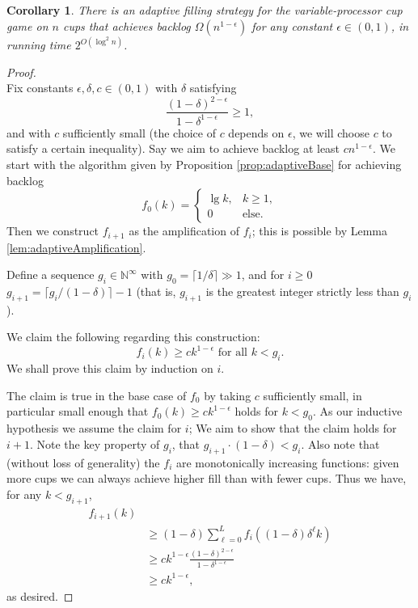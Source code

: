 \documentclass[twocolumn]{article}[11pt]
\newtheorem{corollary}{Corollary}
\begin{document}
\begin{corollary}
  \label{cor:adaptivePoly}
  There is an adaptive filling strategy for the variable-processor cup game on
  $n$ cups that achieves backlog $\Omega(n^{1-\epsilon})$ for any constant
  $\epsilon \in (0,1)$, in running time $2^{O(\log^2 n)}$.
\end{corollary}
\begin{proof}$ $\\
  Fix constants $\epsilon,\delta,c \in (0,1)$ with $\delta$ satisfying 
  $$\frac{(1-\delta)^{2-\epsilon}}{ 1-\delta^{1-\epsilon}}\ge 1,$$
  and with $c$ sufficiently small (the choice of $c$ depends on $\epsilon$, we
  will choose $c$ to satisfy a certain inequality).
  Say we aim to achieve backlog at least $cn^{1-\epsilon}$.
  We start with the algorithm given by Proposition \ref{prop:adaptiveBase} for
  achieving backlog
  $$f_0(k) = 
  \begin{cases} 
    \lg k, & k\geq 1, \\
    0 & \text{else.}
  \end{cases}$$
  Then we construct $f_{i+1}$ as the amplification of $f_{i}$; this is possible
  by Lemma \ref{lem:adaptiveAmplification}. 

  Define a sequence $g_i \in \mathbb{N}^\infty$ with $g_0 = \lceil 1/\delta
  \rceil \gg 1$, and for $i\ge0$ $g_{i+1} =\lceil g_i/(1-\delta)\rceil -1$
  (that is, $g_{i+1}$ is the greatest integer strictly less than $g_i$).

  We claim the following regarding this construction:
  $$f_i(k) \ge ck^{1-\epsilon} \text{ for all } k < g_i.$$
  We shall prove this claim by induction on $i$.

  The claim is true in the base case of $f_0$ by taking $c$ sufficiently small,
  in particular small enough that $f_0(k) \ge ck^{1-\epsilon}$ holds for $k < g_0$.
  As our inductive hypothesis we assume the claim for $i$; We aim to show that
  the claim holds for $i+1$.
  Note the key property of $g_i$, that $g_{i+1}\cdot(1-\delta) < g_i$. Also
  note that (without loss of generality) the $f_i$ are monotonically increasing
  functions: given more cups we can always achieve higher fill than with fewer
  cups.
  Thus we have, for any $k<g_{i+1}$,
  \begin{align*}
    f_{i+1}(k) &\\
    &\ge (1-\delta)\sum_{\ell=0}^L f_i((1-\delta)\delta^\ell k)\\
    &\ge ck^{1-\epsilon}\frac{(1-\delta)^{2-\epsilon}}{1-\delta^{1-\epsilon}}\\
    &\ge ck^{1-\epsilon},
  \end{align*}
  as desired. 


\end{proof}
\end{document}
